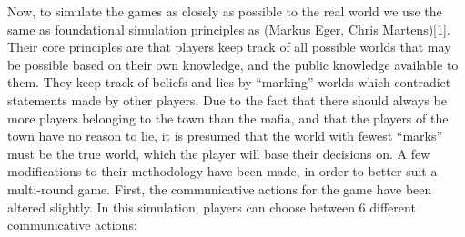 Now, to simulate the games as closely as possible to the real world we use the
same as foundational simulation principles as (Markus Eger, Chris Martens)[1].
Their core principles are that players keep track of all possible worlds that
may be possible based on their own knowledge, and the public knowledge
available to them. They keep track of beliefs and lies by “marking” worlds
which contradict statements made by other players. Due to the fact that there
should always be more players belonging to the town than the mafia, and that
the players of the town have no reason to lie, it is presumed that the world
with fewest “marks” must be the true world, which the player will base their
decisions on. A few modifications to their methodology have been made, in order
to better suit a multi-round game. First, the communicative actions for the
game have been altered slightly. In this simulation, players can choose between
6 different communicative actions:

